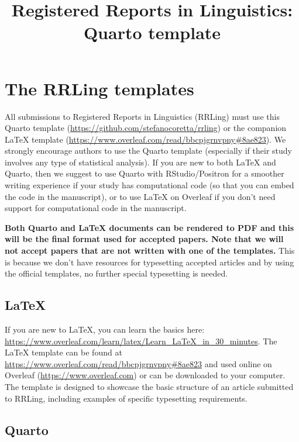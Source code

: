 \documentclass[
]{rrling}
\title{Registered Reports in Linguistics: Quarto template}
\date{}
\begin{document}
\maketitle


\section*{The RRLing templates}\label{the-rrling-templates}

All submissions to Registered Reports in Linguistics (RRLing) must use
this Quarto template (\url{https://github.com/stefanocoretta/rrling}) or
the companion LaTeX template
(\url{https://www.overleaf.com/read/bbcpjgrnvpny\#8ae823}). We strongly
encourage authors to use the Quarto template (especially if their study
involves any type of statistical analysis). If you are new to both LaTeX
and Quarto, then we suggest to use Quarto with RStudio/Positron for a
smoother writing experience if your study has computational code (so
that you can embed the code in the manuscript), or to use LaTeX on
Overleaf if you don't need support for computational code in the
manuscript.

\textbf{Both Quarto and LaTeX documents can be rendered to PDF and this
will be the final format used for accepted papers. Note that we will not
accept papers that are not written with one of the templates.} This is
because we don't have resources for typesetting accepted articles and by
using the official templates, no further special typesetting is needed.

\subsection*{LaTeX}\label{latex}

If you are new to LaTeX, you can learn the basics here:
\url{https://www.overleaf.com/learn/latex/Learn_LaTeX_in_30_minutes}.
The LaTeX template can be found at
\url{https://www.overleaf.com/read/bbcpjgrnvpny\#8ae823} and used online
on Overleaf (\url{https://www.overleaf.com}) or can be downloaded to
your computer. The template is designed to showcase the basic structure
of an article submitted to RRLing, including examples of specific
typesetting requirements.

\subsection*{Quarto}\label{quarto}
\end{document}
